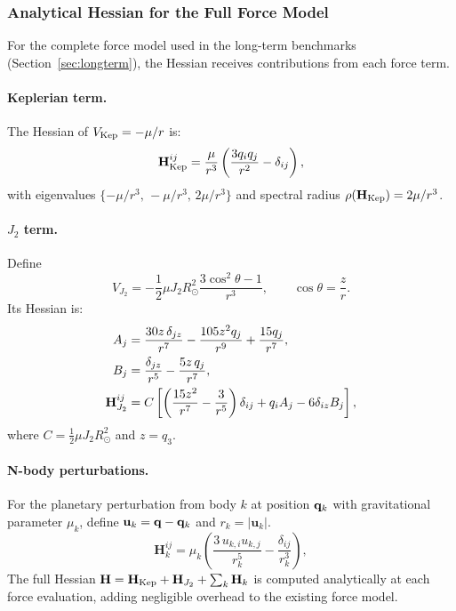 \subsubsection{Analytical Hessian for the Full Force Model}
\label{sec:full_hessian}

For the complete force model used in the long-term benchmarks
(Section~\ref{sec:longterm}), the Hessian receives contributions
from each force term.

\paragraph{Keplerian term.}
The Hessian of $V_{\rm Kep} = -\mu/r$ is:
\begin{equation}
  \mathbf{H}_{\rm Kep}^{ij}
  = \frac{\mu}{r^3}\left(\frac{3q_iq_j}{r^2} - \delta_{ij}\right),
  \label{eq:hessian_keplerian}
\end{equation}
with eigenvalues $\{-\mu/r^3,\,-\mu/r^3,\,2\mu/r^3\}$ and
spectral radius $\rho(\mathbf{H}_{\rm Kep}) = 2\mu/r^3$.

\paragraph{$J_2$ term.}
Define
\begin{equation}
  V_{J_2} = -\frac{1}{2}\mu J_2 R_\odot^2
  \frac{3\cos^2\theta - 1}{r^3},
  \qquad \cos\theta = \frac{z}{r}.
\end{equation}
Its Hessian is:
\begin{align}
  A_j &= \frac{30z\,\delta_{jz}}{r^7}
      - \frac{105z^2 q_j}{r^9}
      + \frac{15q_j}{r^7}, \notag \\
  B_j &= \frac{\delta_{jz}}{r^5} - \frac{5z\,q_j}{r^7}, \notag \\
  \mathbf{H}_{J_2}^{ij}
  &= C\left[\left(\frac{15z^2}{r^7} - \frac{3}{r^5}\right)\delta_{ij}
     + q_i A_j - 6\delta_{iz}B_j\right],
  \label{eq:hessian_j2}
\end{align}
where $C = \tfrac{1}{2}\mu J_2 R_\odot^2$ and $z = q_3$.

\paragraph{N-body perturbations.}
For the planetary perturbation from body $k$ at position
$\mathbf{q}_k$ with gravitational parameter $\mu_k$, define
$\mathbf{u}_k = \mathbf{q}-\mathbf{q}_k$ and $r_k = |\mathbf{u}_k|$.
\begin{equation}
  \mathbf{H}_k^{ij}
  = \mu_k\left(
      \frac{3\,u_{k,i}u_{k,j}}{r_k^5}
      - \frac{\delta_{ij}}{r_k^3}
    \right),
  \label{eq:hessian_nbody}
\end{equation}
The full Hessian $\mathbf{H} = \mathbf{H}_{\rm Kep}
+ \mathbf{H}_{J_2} + \sum_k \mathbf{H}_k$ is computed
analytically at each force evaluation, adding negligible
overhead to the existing force model.

